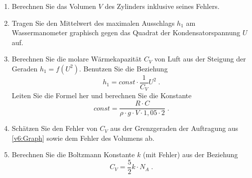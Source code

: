\begin{enumerate}
 \item Berechnen Sie das Volumen $V$ des Zylinders inklusive seines Fehlers.
 \item \label{v6:Graph} Tragen Sie den Mittelwert des maximalen Ausschlags $h_1$ am Wassermanometer graphisch gegen das Quadrat der Kondensatorspannung $U$ auf.
 \item Berechnen Sie die molare Wärmekapazität $C_V$ von Luft aus der Steigung der Geraden $h_1 = f(U^2)$. Benutzen Sie die Beziehung
  \begin{equation}
	 h_1 = const\cdot \frac{1}{C_V}U^2\; .  
  \end{equation}
 Leiten Sie die Formel her und berechnen Sie die Konstante
  \begin{equation}
   const = \frac{R\cdot C}{\rho\cdot g\cdot V\cdot 1,05\cdot 2}\; .
  \end{equation} 
 \item Schätzen Sie den Fehler von $C_V$ aus der Grenzgeraden der Auftragung aus \ref{v6:Graph} sowie dem Fehler des Volumens ab.
 \item Berechnen Sie die Boltzmann Konstante $k$ (mit Fehler) aus der Beziehung
  \begin{equation}
   C_V = \frac{5}{2}k\cdot N_A \; .
  \end{equation}
\end{enumerate}